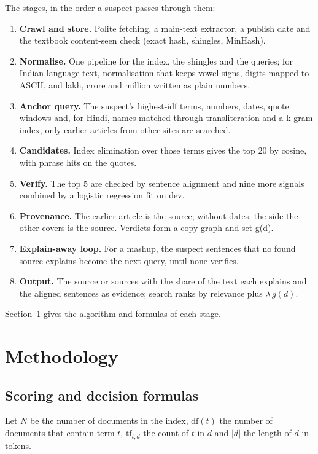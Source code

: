 \documentclass[11pt,a4paper]{article}
\begin{document}
The stages, in the order a suspect passes through them:
\begin{enumerate}
\item \textbf{Crawl and store.} Polite fetching, a main-text extractor, a publish date and the textbook content-seen check (exact hash, shingles, MinHash).
\item \textbf{Normalise.} One pipeline for the index, the shingles and the queries; for Indian-language text, normalisation that keeps vowel signs, digits mapped to ASCII, and lakh, crore and million written as plain numbers.
\item \textbf{Anchor query.} The suspect's highest-idf terms, numbers, dates, quote windows and, for Hindi, names matched through transliteration and a k-gram index; only earlier articles from other sites are searched.
\item \textbf{Candidates.} Index elimination over those terms gives the top 20 by cosine, with phrase hits on the quotes.
\item \textbf{Verify.} The top 5 are checked by sentence alignment and nine more signals combined by a logistic regression fit on dev.
\item \textbf{Provenance.} The earlier article is the source; without dates, the side the other covers is the source. Verdicts form a copy graph and set g(d).
\item \textbf{Explain-away loop.} For a mashup, the suspect sentences that no found source explains become the next query, until none verifies.
\item \textbf{Output.} The source or sources with the share of the text each explains and the aligned sentences as evidence; search ranks by relevance plus $\lambda\,g(d)$.
\end{enumerate}
Section~\ref{sec:method} gives the algorithm and formulas of each stage.

\section{Methodology}
\label{sec:method}

\subsection{Scoring and decision formulas}

Let $N$ be the number of documents in the index, $\mathrm{df}(t)$ the number of documents that contain term $t$, $\mathrm{tf}_{t,d}$ the count of $t$ in $d$ and $|d|$ the length of $d$ in tokens.
\end{document}
